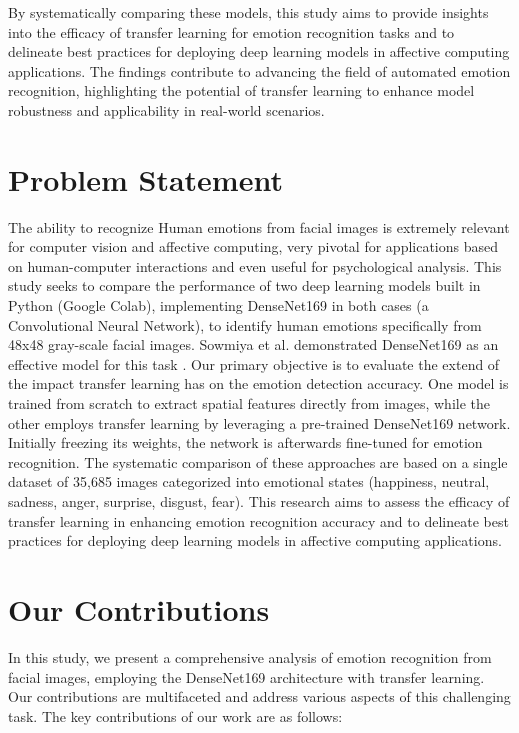 \documentclass[conference]{IEEEtran}
\begin{document}
By systematically comparing these models, this study aims to provide insights into the efficacy of transfer learning for emotion recognition tasks and to delineate best practices for deploying deep learning models in affective computing applications. The findings contribute to advancing the field of automated emotion recognition, highlighting the potential of transfer learning to enhance model robustness and applicability in real-world scenarios.




\section{Problem Statement}
The ability to recognize Human emotions from facial images is extremely relevant for computer vision and affective computing, very pivotal for applications based on human-computer interactions and even useful for psychological analysis. This study seeks to compare the performance of two deep learning models built in Python (Google Colab), implementing DenseNet169 in both cases (a Convolutional Neural Network), to identify human emotions specifically from 48x48 gray-scale facial images. Sowmiya et al. demonstrated DenseNet169 as an effective model for this task \cite{sowmiya2022facial}. Our primary objective is to evaluate the extend of the impact transfer learning has on the emotion detection accuracy. One model is trained from scratch to extract spatial features directly from images, while the other employs transfer learning by leveraging a pre-trained DenseNet169 network. Initially freezing its weights, the network is afterwards fine-tuned for emotion recognition. The systematic comparison of these approaches are based on a single dataset of 35,685 images categorized into emotional states (happiness, neutral, sadness, anger, surprise, disgust, fear). This research aims to assess the efficacy of transfer learning in enhancing emotion recognition accuracy and to delineate best practices for deploying deep learning models in affective computing applications.



\section{Our Contributions}
In this study, we present a comprehensive analysis of emotion recognition from facial images, employing the DenseNet169 architecture with transfer learning. Our contributions are multifaceted and address various aspects of this challenging task. The key contributions of our work are as follows:
\end{document}
